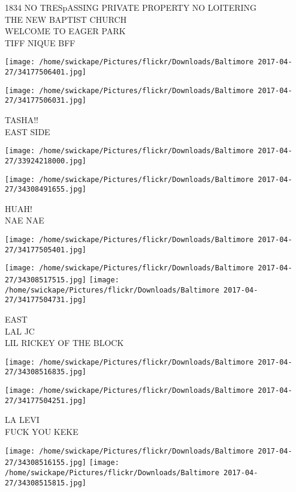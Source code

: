 \documentclass[10pt,letterpaper]{article}
\begin{document}
1834 NO TRESpASSING PRIVATE PROPERTY NO LOITERING\\
THE NEW BAPTIST CHURCH\\
WELCOME TO EAGER PARK\\
TIFF NIQUE BFF\\
\pagebreak

\texttt{[image: /home/swickape/Pictures/flickr/Downloads/Baltimore 2017-04-27/34177506401.jpg]}

\vspace{0.25in}
\texttt{[image: /home/swickape/Pictures/flickr/Downloads/Baltimore 2017-04-27/34177506031.jpg]}

TASHA!!\\
EAST SIDE\\
\pagebreak

\texttt{[image: /home/swickape/Pictures/flickr/Downloads/Baltimore 2017-04-27/33924218000.jpg]}

\vspace{0.25in}
\texttt{[image: /home/swickape/Pictures/flickr/Downloads/Baltimore 2017-04-27/34308491655.jpg]}

HUAH!\\
NAE NAE\\
\pagebreak

\texttt{[image: /home/swickape/Pictures/flickr/Downloads/Baltimore 2017-04-27/34177505401.jpg]}

\vspace{0.25in}
\texttt{[image: /home/swickape/Pictures/flickr/Downloads/Baltimore 2017-04-27/34308517515.jpg]}
\texttt{[image: /home/swickape/Pictures/flickr/Downloads/Baltimore 2017-04-27/34177504731.jpg]}

EAST\\
LAL JC\\
LIL RICKEY OF THE BLOCK\\
\pagebreak

\texttt{[image: /home/swickape/Pictures/flickr/Downloads/Baltimore 2017-04-27/34308516835.jpg]}

\vspace{0.25in}
\texttt{[image: /home/swickape/Pictures/flickr/Downloads/Baltimore 2017-04-27/34177504251.jpg]}

LA LEVI\\
FUCK YOU KEKE\\
\pagebreak

\texttt{[image: /home/swickape/Pictures/flickr/Downloads/Baltimore 2017-04-27/34308516155.jpg]}
\texttt{[image: /home/swickape/Pictures/flickr/Downloads/Baltimore 2017-04-27/34308515815.jpg]}
\end{document}
